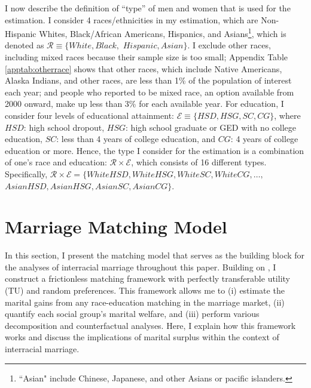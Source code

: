 I now describe the definition of ``type'' of men and women that is used for the estimation. I consider 4 races/ethnicities in my estimation, which are Non-Hispanic Whites, Black/African Americans, Hispanics, and Asians\footnote{``Asian" include Chinese, Japanese, and other Asians or pacific islanders.}, which is denoted as  $\mathcal{R} \equiv \{ White, Black,$ $Hispanic, Asian \}$. I exclude other races, including mixed races because their sample size is too small; Appendix Table \ref{apptab:otherrace} shows that other races, which include Native Americans, Alaska Indians, and other races, are less than 1\% of the population of interest each year; and people who reported to be mixed race, an option available from 2000 onward, make up less than 3\% for each available year. For education, I consider four levels of educational attainment: $\mathcal{E} \equiv \{HSD, HSG, SC, CG \}$, where $HSD$: high school dropout, $HSG$: high school graduate or GED with no college education, $SC$: less than 4 years of college education, and $CG$: 4 years of college education or more. Hence, the type I consider for the estimation is a combination of one's race and education:  $\mathcal{R} \times \mathcal{E}$, which consists of 16 different types. Specifically, $\mathcal{R} \times \mathcal{E} = \{ WhiteHSD, WhiteHSG, WhiteSC, WhiteCG, \ldots,$  $AsianHSD, AsianHSG, AsianSC, AsianCG \}$.



\section{Marriage Matching Model}  \label{sec:model}

In this section, I present the matching model that serves as the building block for the analyses of interracial marriage throughout this paper. Building on \cite{ChooSiow_2006_WhoMarriesWhomandWhy}, I construct a frictionless matching framework with perfectly transferable utility (TU) and random preferences. This framework allows me to (i) estimate the marital gains from any race-education matching in the marriage market, (ii) quantify each social group's marital welfare, and (iii) perform various decomposition and counterfactual analyses. Here, I explain how this framework works and discuss the implications of marital surplus within the context of interracial marriage.

